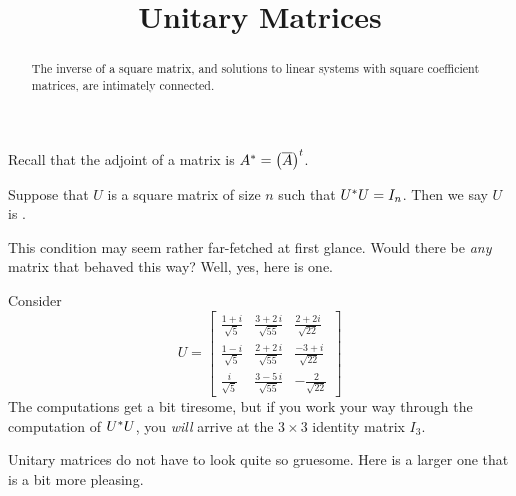 \documentclass{ximera}
\title{Unitary Matrices}
\begin{document}
\begin{abstract}
  The inverse of a square matrix, and solutions to linear systems with square coefficient matrices, are intimately connected.
\end{abstract}
\maketitle

Recall that the adjoint of a matrix is
$A^\ast=\left(\overline{A}\right)^{t}$.

\begin{definition}
  Suppose that $U$ is a square matrix of size $n$ such that
  $U^\ast U=I_n$.  Then we say $U$ is .
\end{definition}

This condition may seem rather far-fetched at first glance.  Would
there be \textit{any} matrix that behaved this way?  Well, yes, here
is one.

\begin{example}
  Consider
  \[
    U=
    \begin{bmatrix}
      \frac{1 + i }{{\sqrt{5}}} &
      \frac{3 + 2\,i }{{\sqrt{55}}} &
      \frac{2+2i}{\sqrt{22}} \\
      \frac{1 - i }{{\sqrt{5}}} &
      \frac{2 + 2\,i }{{\sqrt{55}}} &
      \frac{-3 + i }{{\sqrt{22}}} \\
      \frac{i }{{\sqrt{5}}} &
      \frac{3 - 5\,i }{{\sqrt{55}}} &
      -\frac{2}{\sqrt{22}}
    \end{bmatrix}
  \]
  The computations get a bit tiresome, but if you work your way through the computation of $U^\ast U$, you \textit{will} arrive at the $3\times 3$ identity matrix $I_3$.
\end{example}


Unitary matrices do not have to look quite so gruesome.  Here is a larger one that is a bit more pleasing.
\end{document}

